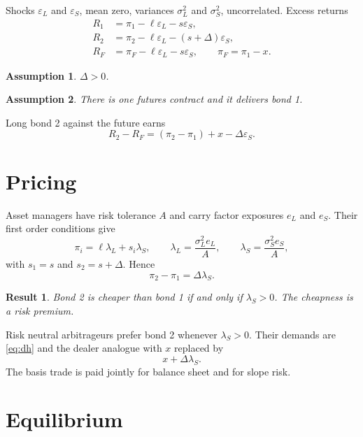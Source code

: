\documentclass[12pt]{article}
\newtheorem{assumption}{Assumption}
\newtheorem{result}{Result}
\begin{document}
Shocks $\varepsilon_L$ and $\varepsilon_S$, mean zero, variances $\sigma_L^2$ and $\sigma_S^2$, uncorrelated. Excess returns
\begin{align}
R_1 &= \pi_1 - \ell \varepsilon_L - s \varepsilon_S , \\
R_2 &= \pi_2 - \ell \varepsilon_L - (s + \Delta) \varepsilon_S , \\
R_F &= \pi_F - \ell \varepsilon_L - s \varepsilon_S , \qquad \pi_F = \pi_1 - x .
\end{align}
\begin{assumption}
$\Delta > 0$.
\end{assumption}
\begin{assumption}
There is one futures contract and it delivers bond 1.
\end{assumption}
Long bond 2 against the future earns
\begin{equation}
R_2 - R_F = (\pi_2 - \pi_1) + x - \Delta \varepsilon_S .
\label{eq:trade}
\end{equation}

\section{Pricing}

Asset managers have risk tolerance $A$ and carry factor exposures $e_L$ and $e_S$. Their first order conditions give
\begin{equation}
\pi_i = \ell \lambda_L + s_i \lambda_S , \qquad
\lambda_L = \frac{\sigma_L^2 e_L}{A}, \qquad
\lambda_S = \frac{\sigma_S^2 e_S}{A} ,
\end{equation}
with $s_1 = s$ and $s_2 = s + \Delta$. Hence
\begin{equation}
\pi_2 - \pi_1 = \Delta \lambda_S .
\label{eq:cheap}
\end{equation}
\begin{result}
Bond 2 is cheaper than bond 1 if and only if $\lambda_S > 0$. The cheapness is a risk premium.
\end{result}
Risk neutral arbitrageurs prefer bond 2 whenever $\lambda_S > 0$. Their demands are \eqref{eq:dh} and the dealer analogue with $x$ replaced by
\begin{equation}
x + \Delta \lambda_S .
\label{eq:comp}
\end{equation}
The basis trade is paid jointly for balance sheet and for slope risk.

\section{Equilibrium}
\end{document}

